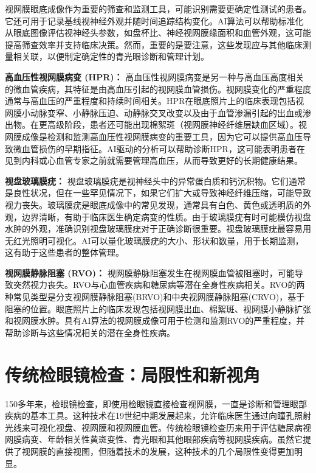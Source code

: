 \documentclass[
  Letterpaper,
]{scrbook}
\begin{document}
视网膜眼底成像作为重要的筛查和监测工具，可能识别需要更确定性测试的患者。它还可用于记录基线视神经外观并随时间追踪结构变化。AI算法可以帮助标准化从眼底图像评估视神经头参数，如盘杯比、神经视网膜缘面积和血管外观，这可能提高筛查效率并支持临床决策。然而，重要的是要注意，这些发现应与其他临床测量相关联，以便制定确定性的青光眼诊断和管理计划。

\textbf{高血压性视网膜病变 (HPR)：}
高血压性视网膜病变是另一种与高血压高度相关的微血管疾病，其特征是由高血压引起的视网膜血管损伤。视网膜变化的严重程度通常与高血压的严重程度和持续时间相关。HPR在眼底照片上的临床表现包括视网膜小动脉变窄、小静脉压迫、动静脉交叉改变以及由于血管渗漏引起的出血或渗出物。在更高级阶段，患者还可能出现棉絮斑（视网膜神经纤维层缺血区域）。视网膜成像是检测和监测高血压性视网膜病变的重要工具，因为它可以提供高血压导致微血管损伤的早期指征。AI驱动的分析可以帮助诊断HPR，这可能表明患者在见到内科或心血管专家之前就需要管理高血压，从而导致更好的长期健康结果。

\textbf{视盘玻璃膜疣：}
视盘玻璃膜疣是视神经头中的异常蛋白质和钙沉积物。它们通常是良性状况，但在一些罕见情况下，如果它们扩大或导致神经纤维压缩，可能导致视力丧失。玻璃膜疣是眼底成像中的常见发现，通常具有白色、黄色或透明质的外观，边界清晰，有助于临床医生确定病变的性质。由于玻璃膜疣有时可能模仿视盘水肿的外观，准确识别视盘玻璃膜疣对于正确诊断很重要。视盘玻璃膜疣最容易用无红光照明可视化。AI可以量化玻璃膜疣的大小、形状和数量，用于长期监测，这有助于这些患者的整体管理。

\textbf{视网膜静脉阻塞 (RVO)：}
视网膜静脉阻塞发生在视网膜血管被阻塞时，可能导致突然视力丧失。RVO与心血管疾病和糖尿病等潜在全身性疾病相关。RVO的两种常见类型是分支视网膜静脉阻塞(BRVO)和中央视网膜静脉阻塞(CRVO)，基于阻塞的位置。眼底照片上的临床发现包括视网膜出血、棉絮斑、视网膜小静脉扩张和视网膜水肿。具有AI算法的视网膜成像可用于检测和监测RVO的严重程度，并帮助诊断与这些情况相关的潜在全身性疾病。

\section{传统检眼镜检查：局限性和新视角}\label{ux4f20ux7edfux68c0ux773cux955cux68c0ux67e5ux5c40ux9650ux6027ux548cux65b0ux89c6ux89d2}

150多年来，检眼镜检查，即使用检眼镜直接检查视网膜，一直是诊断和管理眼部疾病的基本工具。这种技术在19世纪中期发展起来，允许临床医生通过向瞳孔照射光线来可视化视盘、视网膜和视网膜血管。传统检眼镜检查历来用于评估糖尿病视网膜病变、年龄相关性黄斑变性、青光眼和其他眼部疾病等视网膜疾病。虽然它提供了视网膜的直接视图，但随着技术的发展，这种技术的几个局限性变得更加明显。
\end{document}
